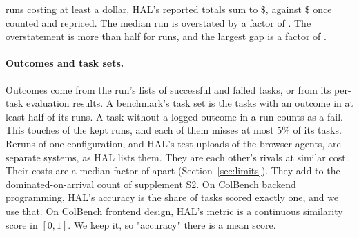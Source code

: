 \documentclass[11pt]{article}
\begin{document}
runs costing at least a dollar, HAL's reported totals sum to \$\NumCostReportedTotal{}, against \$\NumCostRecountedTotal{} once counted and repriced. The median run is overstated by a factor of \NumCostRatioMedian{}. The overstatement is more than half for \NumCostRatioAboveOneAndHalf{} runs, and the largest gap is a factor of \NumCostRatioMax{}.

\paragraph{Outcomes and task sets.}
Outcomes come from the run's lists of successful and failed tasks, or from its per-task evaluation results. A benchmark's task set is the tasks with an outcome in at least half of its runs. A task without a logged outcome in a run counts as a fail. This touches \NumHalSystemsMissingOutcome{} of the \NumHalRunsKept{} kept runs, and each of them misses at most 5\% of its tasks. Reruns of one configuration, and HAL's test uploads of the browser agents, are separate systems, as HAL lists them. They are each other's rivals at similar cost. Their costs are a median factor of \NumRerunCostRatioMedian{} apart (Section~\ref{sec:limits}). They add to the dominated-on-arrival count of supplement S2. On ColBench backend programming, HAL's accuracy is the share of tasks scored exactly one, and we use that. On ColBench frontend design, HAL's metric is a continuous similarity score in $[0,1]$. We keep it, so "accuracy" there is a mean score.
\end{document}
